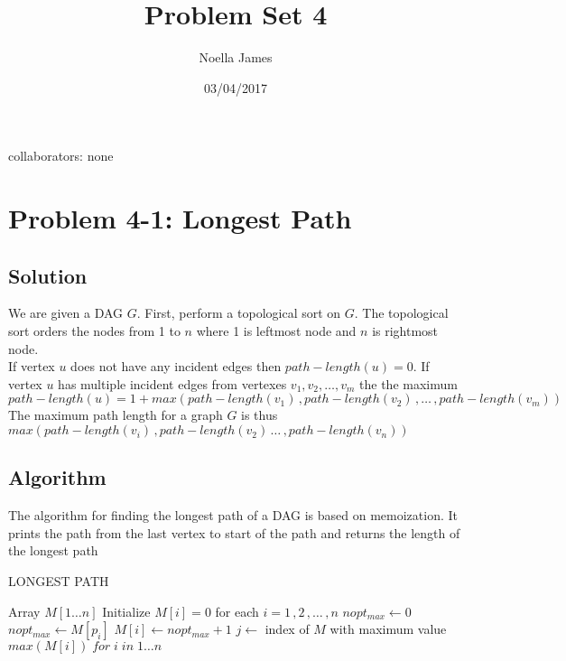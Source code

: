 \documentclass{article}
\theoremstyle{definition}
\theoremstyle{remark}
\theoremstyle{plain}
\begin{document}
\title{Problem Set 4}
\date{03/04/2017}
\author{Noella James}
\maketitle
collaborators: none\\

\section*{Problem 4-1: Longest Path}

\subsection*{Solution}
We are given a DAG $G$. First, perform a topological sort on $G$. The topological sort orders the nodes from 1 to $n$ where 1 is leftmost node and $n$ is rightmost node. \\
If vertex $u$ does not have any incident edges then $path-length(u) = 0 $. If vertex $u$ has multiple incident edges from vertexes $v_1,v_2,\ldots ,v_m$ the the maximum 
$path-length(u) = 1 + max (path-length(v_1)\,,path-length(v_2)\,,\ldots\,,path-length(v_m))$
The maximum path length for a graph $G$ is thus $max ( path-length(v_i)\,, path-length(v_2)\,\ldots\,,path-length(v_n))$

\subsection*{Algorithm}
The algorithm for finding the longest path of a DAG is based on memoization. It prints the path from the last vertex to start of the path and returns the length of the longest path\\

\begin{algorithm}
\caption{LONGEST PATH}\label{Find the longest path in a DAG}
\begin{algorithmic}[1]
 
        \State {}
        \State Array $M[1\ldots n]$
        \State Initialize $M[i] = 0$ for each $i=1\,,2\,,\ldots\,,n$
			\State $nopt_{max} \gets 0$
					\State $nopt_{max} \gets M[p_i]$
				\EndIf
			\EndFor
			\State $M[i] \gets nopt_{max} + 1$
		\EndIf
	\EndFor
	\State $j \gets $ index of $M$ with maximum value
	\State {}
	\State \Return $max (M[i] )\;for\; i \;in\; 1\ldots n$
\EndProcedure

\end{algorithmic}
\end{algorithm}
\end{document}
